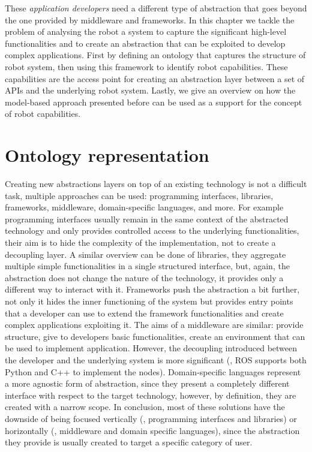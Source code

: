 These \textit{application developers} need a different type of abstraction that goes beyond the one provided by middleware and frameworks. In this chapter we tackle the problem of analysing the robot a system to capture the significant high-level functionalities and to create an abstraction that can be exploited to develop complex applications. First by defining an ontology that captures the structure of robot system, then using this framework to identify robot capabilities. These capabilities are the access point for creating an abstraction layer between a set of APIs and the underlying robot system. Lastly, we give an overview on how the model-based approach presented before can be used as a support for the concept of robot capabilities.

\minitoc
\newpage

\section{Ontology representation}
Creating new abstractions layers on top of an existing technology is not a difficult task, multiple approaches can be used: programming interfaces, libraries, frameworks, middleware, domain-specific languages, and more. For example programming interfaces usually remain in the same context of the abstracted technology and only provides controlled access to the underlying functionalities, their aim is to hide the complexity of the implementation, not to create a decoupling layer.  A similar overview can be done of libraries, they aggregate multiple simple functionalities in a single structured interface, but, again, the abstraction does not change the nature of the technology, it provides only a different way to interact with it. Frameworks push the abstraction a bit further, not only it hides the inner functioning of the system but provides entry points that a developer can use to extend the framework functionalities and create complex applications exploiting it. The aims of a middleware are similar: provide structure, give to developers basic functionalities, create an environment that can be used to implement application. However, the decoupling introduced between the developer and the underlying system is more significant (\eg, ROS supports both Python and C++ to implement the nodes). Domain-specific languages represent a more agnostic form of abstraction, since they present a completely different interface with respect to the target  technology, however, by definition, they are created with a narrow scope. In conclusion, most of these solutions have the downside of being focused vertically (\eg, programming interfaces and libraries) or horizontally (\eg, middleware and domain specific languages), since the abstraction they provide is usually created to target a specific category of user.

